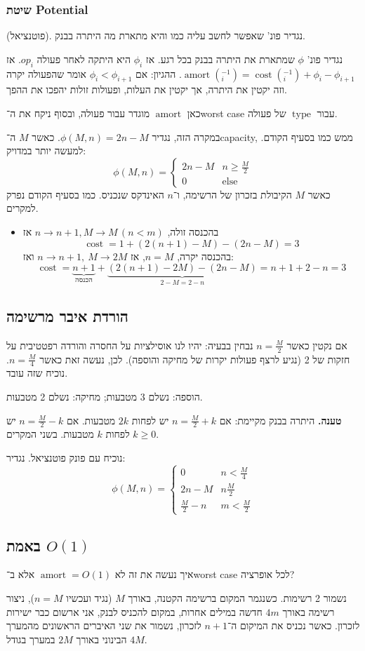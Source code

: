 \documentclass[]{article}
\newcommand\other {\mathrm{else}}
\newcommand\op    {^{-1}}
\theoremstyle{definition}
\DeclareMathOperator\amort   {amort}
\DeclareMathOperator\type    {type}
\DeclareMathOperator\cost    {cost}
\begin{document}
	\subsubsection{שיטת Potential}
	(פוטנציאל). נגדיר פונ' שאפשר לחשב עליה כמו והיא מתארת מה היתרה בבנק. 
	
	נגדיר פונ' $\phi$ שמתארת את היתרה בבנק בכל רגע. אז $\phi_i$ היא היתקה לאחר פעולה $op_i$. אז $\amort(\op_i) = \cost(\op_i) + \phi_i - \phi_{i + 1}$. ההגיון: אם $\phi_i < \phi_{i + 1}$ אומר שהפעולה יקרה וזה יקטין את היתרה, אך יקטין את העלות, ופעולות זולות יהפכו את ההפך. 
	
	כאן $\amort$ מוגדר עבור פעולה, ובסוף ניקח את ה־worst case עבור $\type$ של פעולה. 
	
	במקרה הזה, נגדיר $\phi(M, n) = 2n - M$. כאשר $M$ ה־capacity, ממש כמו בסעיף הקודם. למעשה יותר במדויק: 
	\[ \phi(M, n) = \begin{cases}
		2n - M & n \ge \frac{M}{2} \\
		0 & \other
	\end{cases} \]
	כאשר $M$ הקיבולת בזכרון של הרשימה, ו־$n$ האינדקס שנכניס. 
	כמו בסעיף הקודם נפרק למקרים. 
	\begin{itemize}
		\item בהכנסה זולה, $n \to n + 1, M \to M \, (n < m)$  אז
		\[ \cost = 1 + (2(n + 1) - M) - (2n - M) = 3 \]
		בהכנסה יקרה, $n = M$, אז $n \to n + 1, \ M \to 2M$ ואז: 
		\[ \cost = \underbrace{n + 1}_{\text{הכנסה}} + \underbrace{(2(n + 1) - 2M) - (2n - M)}_{2 - M = 2 - n} = n + 1 + 2 - n = 3 \]
		
	\end{itemize}
	
	
	\subsection{הורדת איבר מרשימה}
	אם נקטין כאשר $n = \frac{M}{2}$ נבחין בבעיה: יהיו לנו אוסילציות על החסרה והורדה רפטטיבית על חזקות של 2 (נגיע לרצף פעולות יקרות של מחיקה והוספה). לכן, נעשה זאת כאשר $n = \frac{M}{4}$. נוכיח שזה עובד. 
	
	הוספה: נשלם 3 מטבעות; מחיקה: נשלם 2 מטבעות. 
	
	\textbf{טענה. }היתרה בבנק מקיימת: אם $n = \frac{M}{2} + k$ יש לפחות $2k$ מטבעות. אם $n = \frac{M}{2} - k$ יש לפחות $k$ מטבעות. בשני המקרים $k \ge 0$. 
	
	נוכיח עם פונק פוטנציאל. נגדיר: 
	\[ \phi(M, n) = \begin{cases}
		0 & n < \frac{M}{4} \\
		2n - M & n \frac{M}{2} \\
		\frac{M}{2} - n & m < \frac{M}{2}
	\end{cases} \]
	
	\subsection{באמת $O(1)$}
	איך נעשה את זה לא $\amort = O(1)$ אלא ב־worst case לכל אופרציה? 
	
	נשמור 2 רשימות. כשנגמר המקום ברשימה הקטנה, באורך $M$ (נגיד ועכשיו $n = M$), ניצור רשימה באורך $4m$ חדשה במילים אחרות, במקום להכניס לבנק, אני ארשום כבר ישירות לזכרון. כאשר נכניס את המיקום ה־$n + 1$ לזכרון, נשמור את שני האיברים הראשונים מהמערך הבינוני באורך $2M$ במערך בגודל $4M$. 
	
\end{document}
